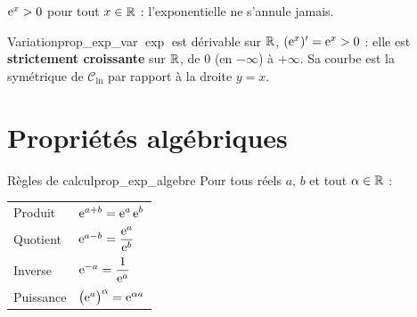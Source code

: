 \begin{attention}
	$\mathrm{e}^{x}>0$ pour tout $x\in\mathbb{R}$ : l'exponentielle ne s'annule jamais.
\end{attention}

\begin{propriete}{Variation}{prop_exp_var}
	$\exp$ est dérivable sur $\mathbb{R}$, $(\mathrm{e}^{x})'=\mathrm{e}^{x}>0$ : elle est
	\textbf{strictement croissante} sur $\mathbb{R}$, de $0$ (en $-\infty$) à $+\infty$.
	Sa courbe est la symétrique de $\mathcal C_{\ln}$ par rapport à la droite
	$y=x$.
\end{propriete}

\begin{center}
\end{center}


\section{Propriétés algébriques}

\begin{propriete}{Règles de calcul}{prop_exp_algebre}
	Pour tous réels $a$, $b$ et tout $\alpha\in\mathbb{R}$ :
	\begin{center}
	\renewcommand{\arraystretch}{1.9}
	\begin{tabular}{>{\raggedright\arraybackslash}p{3.2cm}
	                >{\centering\arraybackslash}p{4.6cm}}
	\hline
	Produit     & $\mathrm{e}^{a+b}=\mathrm{e}^{a}\,\mathrm{e}^{b}$ \\
	Quotient    & $\mathrm{e}^{a-b}=\dfrac{\mathrm{e}^{a}}{\mathrm{e}^{b}}$ \\
	Inverse     & $\mathrm{e}^{-a}=\dfrac{1}{\mathrm{e}^{a}}$ \\
	Puissance   & $\bigl(\mathrm{e}^{a}\bigr)^{\alpha}=\mathrm{e}^{\alpha a}$ \\
	\hline
	\end{tabular}
	\end{center}
\end{propriete}

